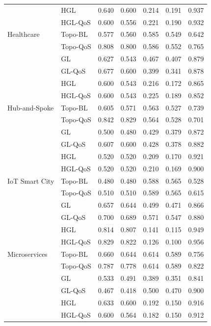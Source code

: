 \documentclass[review]{elsarticle}
\begin{document}
\begin{longtable}{@{}llrrrrr@{}}
 & HGL & 0.640 & 0.600 & 0.214 & 0.191 & 0.937 \\
 & HGL-QoS & 0.600 & 0.556 & 0.221 & 0.190 & 0.932 \\
\addlinespace
Healthcare & Topo-BL & 0.577 & 0.560 & 0.585 & 0.549 & 0.642 \\
 & Topo-QoS & 0.808 & 0.800 & 0.586 & 0.552 & 0.765 \\
 & GL & 0.627 & 0.543 & 0.467 & 0.407 & 0.879 \\
 & GL-QoS & 0.677 & 0.600 & 0.399 & 0.341 & 0.878 \\
 & HGL & 0.600 & 0.543 & 0.216 & 0.172 & 0.865 \\
 & HGL-QoS & 0.600 & 0.543 & 0.225 & 0.189 & 0.852 \\
\addlinespace
Hub-and-Spoke & Topo-BL & 0.605 & 0.571 & 0.563 & 0.527 & 0.739 \\
 & Topo-QoS & 0.842 & 0.829 & 0.564 & 0.528 & 0.701 \\
 & GL & 0.500 & 0.480 & 0.429 & 0.379 & 0.872 \\
 & GL-QoS & 0.607 & 0.600 & 0.428 & 0.378 & 0.882 \\
 & HGL & 0.520 & 0.520 & 0.209 & 0.170 & 0.921 \\
 & HGL-QoS & 0.520 & 0.520 & 0.210 & 0.169 & 0.900 \\
\addlinespace
IoT Smart City & Topo-BL & 0.480 & 0.480 & 0.588 & 0.565 & 0.528 \\
 & Topo-QoS & 0.510 & 0.510 & 0.589 & 0.565 & 0.615 \\
 & GL & 0.657 & 0.644 & 0.499 & 0.471 & 0.866 \\
 & GL-QoS & 0.700 & 0.689 & 0.571 & 0.547 & 0.880 \\
 & HGL & 0.814 & 0.807 & 0.141 & 0.115 & 0.949 \\
 & HGL-QoS & 0.829 & 0.822 & 0.126 & 0.100 & 0.956 \\
\addlinespace
Microservices & Topo-BL & 0.660 & 0.644 & 0.614 & 0.589 & 0.756 \\
 & Topo-QoS & 0.787 & 0.778 & 0.614 & 0.589 & 0.822 \\
 & GL & 0.533 & 0.491 & 0.389 & 0.351 & 0.841 \\
 & GL-QoS & 0.467 & 0.418 & 0.500 & 0.470 & 0.900 \\
 & HGL & 0.633 & 0.600 & 0.192 & 0.150 & 0.916 \\
 & HGL-QoS & 0.600 & 0.564 & 0.182 & 0.150 & 0.912 \\
\end{longtable}
\end{document}

